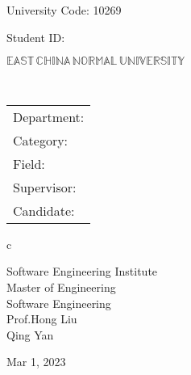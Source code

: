 \newpage

\pagestyle{empty}

\newline
\hspace*{\fill} {University Code: 10269}\\
\hspace*{\fill} {Student ID: 

}%

\vskip 2cm

\begin{center}
    {\Huge $\mathbb{EAST}\,\mathbb{CHINA}\,\mathbb{NORMAL}\,
            \mathbb{UNIVERSITY}$}
\end{center}

\vskip 3cm

\begin{center}
    \bfseries{\scshape{\huge \thesisETitle}}\\
\end{center}

\vskip 2cm {\large
        \begin{center}
            \begin{tabular}{l}
                Department:         \\
                Category:              \\
                Field: \\
                Supervisor:         \\
                Candidate:
            \end{tabular}
            \begin{tabular}c

    

                   Software Engineering Institute      \\
                \hline Master of Engineering \\
                \hline Software Engineering \\
                \hline Prof.Hong Liu \\
                \hline Qing Yan \\

                \hline
            \end{tabular}
        \end{center}}

\vskip 30mm

\begin{center}
    {\Large Mar 1, 2023}
\end{center}

